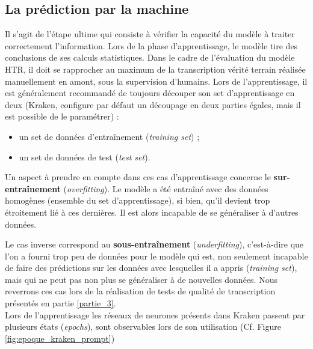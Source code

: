 \subsection{La prédiction par la machine}

Il s'agit de l'étape ultime qui consiste à vérifier la capacité du modèle à traiter correctement l'information. Lors de la phase d'apprentissage, le modèle tire des conclusions de ses calculs statistiques. Dans le cadre de l'évaluation du modèle HTR, il doit se rapprocher au maximum de la transcription vérité terrain réalisée manuellement en amont, sous la supervision d'humains. Lors de l'apprentissage, il est généralement recommandé de toujours découper son set d'apprentissage en deux (Kraken, configure par défaut un découpage en deux parties égales, mais il est possible de le paramétrer) :

\begin{itemize}
    \item un set de données d'entraînement (\textit{training set}) ;
    \item un set de données de test (\textit{test set}).\\ 
\end{itemize}

Un aspect à prendre en compte dans ces cas d'apprentissage concerne le \textbf{sur-entraînement} (\textit{overfitting}). Le modèle a été entraîné avec des données homogènes (ensemble du set d'apprentissage), si bien, qu'il devient trop étroitement lié à ces dernières. Il est alors incapable de se généraliser à d'autres données. 

Le cas inverse correspond au \textbf{sous-entraînement} (\textit{underfitting}), c'est-à-dire que l'on a fourni trop peu de données pour le modèle qui est, non seulement incapable de faire des prédictions sur les données avec lesquelles il a appris (\textit{training set}), mais qui ne peut pas non plus se généraliser à de nouvelles données. Nous reverrons ces cas lors de la réalisation de tests de qualité de transcription présentés en partie \ref{partie_3}.\\ 

Lors de l'apprentissage les réseaux de neurones présents dans Kraken passent par plusieurs états (\textit{epochs}), sont observables lors de son utilisation (Cf. Figure \ref{fig:epoque_kraken_prompt}) \\

